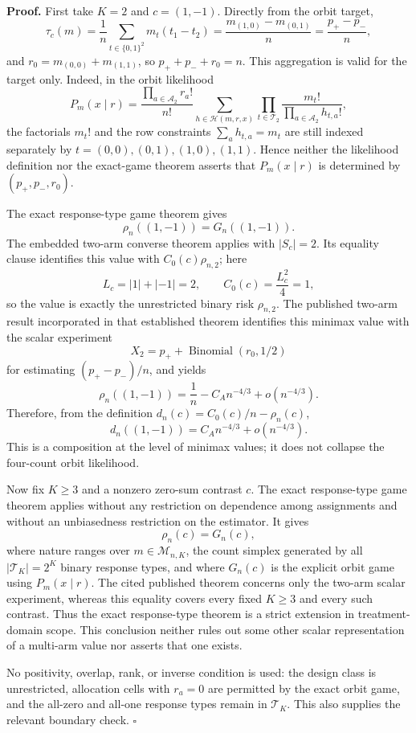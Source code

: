 \textbf{Proof.}
First take \(K=2\) and \(c=(1,-1)\).  Directly from the orbit target,
\[
 \tau_c(m)
 =\frac{1}{n}\sum_{t\in\{0,1\}^2}m_t(t_1-t_2)
 =\frac{m_{(1,0)}-m_{(0,1)}}{n}
 =\frac{p_+-p_-}{n},
\]
and \(r_0=m_{(0,0)}+m_{(1,1)}\), so \(p_++p_-+r_0=n\).  This aggregation is valid for the target only.  Indeed, in the orbit likelihood
\[
 P_m(x\mid r)
 =\frac{\prod_{a\in\mathcal A_2}r_a!}{n!}
 \sum_{h\in\mathcal H(m,r,x)}
 \prod_{t\in\mathcal T_2}\frac{m_t!}{\prod_{a\in\mathcal A_2}h_{t,a}!},
\]
the factorials \(m_t!\) and the row constraints
\(\sum_a h_{t,a}=m_t\) are still indexed separately by
\(t=(0,0),(0,1),(1,0),(1,1)\).  Hence neither the likelihood definition nor the exact-game theorem asserts that \(P_m(x\mid r)\) is determined by \((p_+,p_-,r_0)\).

The exact response-type game theorem gives
\[
 \rho_n((1,-1))=G_n((1,-1)).
\]
The embedded two-arm converse theorem applies with \(|S_c|=2\).  Its equality clause identifies this value with \(C_0(c)\rho_{n,2}\); here
\[
 L_c=|1|+|-1|=2,
 \qquad
 C_0(c)=\frac{L_c^2}{4}=1,
\]
so the value is exactly the unrestricted binary risk \(\rho_{n,2}\).  The published two-arm result incorporated in that established theorem identifies this minimax value with the scalar experiment
\[
 X_2=p_++\operatorname{Binomial}(r_0,1/2)
\]
for estimating \((p_+-p_-)/n\), and yields
\[
 \rho_n((1,-1))
 =\frac{1}{n}-C_A n^{-4/3}+o(n^{-4/3}).
\]
Therefore, from the definition \(d_n(c)=C_0(c)/n-\rho_n(c)\),
\[
 d_n((1,-1))=C_A n^{-4/3}+o(n^{-4/3}).
\]
This is a composition at the level of minimax values; it does not collapse the four-count orbit likelihood.

Now fix \(K\geq3\) and a nonzero zero-sum contrast \(c\).  The exact response-type game theorem applies without any restriction on dependence among assignments and without an unbiasedness restriction on the estimator.  It gives
\[
 \rho_n(c)=G_n(c),
\]
where nature ranges over \(m\in\mathcal M_{n,K}\), the count simplex generated by all \(|\mathcal T_K|=2^K\) binary response types, and where \(G_n(c)\) is the explicit orbit game using \(P_m(x\mid r)\).  The cited published theorem concerns only the two-arm scalar experiment, whereas this equality covers every fixed \(K\geq3\) and every such contrast.  Thus the exact response-type theorem is a strict extension in treatment-domain scope.  This conclusion neither rules out some other scalar representation of a multi-arm value nor asserts that one exists.

No positivity, overlap, rank, or inverse condition is used: the design class is unrestricted, allocation cells with \(r_a=0\) are permitted by the exact orbit game, and the all-zero and all-one response types remain in \(\mathcal T_K\).  This also supplies the relevant boundary check. \(\square\)
